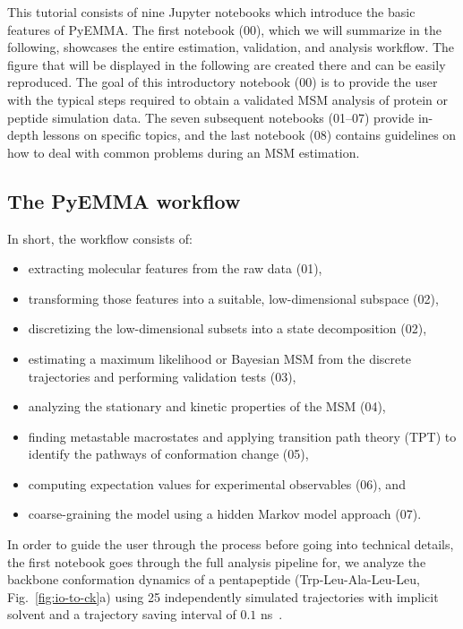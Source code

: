 \documentclass[9pt,tutorial]{livecoms}
\begin{document}
This tutorial consists of nine Jupyter notebooks which introduce the basic features of PyEMMA.
The first notebook (00), which we will summarize in the following, showcases the entire estimation, validation, and analysis workflow. 
The figure that will be displayed in the following are created there and can be easily reproduced.
The goal of this introductory notebook (00) is to provide the user with the typical steps required to obtain a validated MSM analysis of protein or peptide simulation data.
The seven subsequent notebooks (01--07) provide in-depth lessons on specific topics, and the last notebook (08) contains guidelines on how to deal with common problems during an MSM estimation.

\subsection{The PyEMMA workflow}

In short, the workflow consists of:
\begin{itemize}
	\item extracting molecular features from the raw data (01),
	\item transforming those features into a suitable, low-dimensional subspace (02),
	\item discretizing the low-dimensional subsets into a state decomposition (02),
	\item estimating a maximum likelihood or Bayesian MSM from the discrete trajectories and performing validation tests (03),
	\item analyzing the stationary and kinetic properties of the MSM (04),
	\item finding metastable macrostates and applying transition path theory (TPT) to identify the pathways of conformation change (05),
	\item computing expectation values for experimental observables (06), and
	\item coarse-graining the model using a hidden Markov model approach (07).
\end{itemize}

In order to guide the user through the process before going into technical details,
the first notebook goes through the full analysis pipeline for,
we analyze the backbone conformation dynamics of a pentapeptide (Trp-Leu-Ala-Leu-Leu, Fig.~\ref{fig:io-to-ck}a) using 25 independently simulated trajectories with implicit solvent and a trajectory saving interval of $0.1$ ns~\cite{pyemma}.
\end{document}
